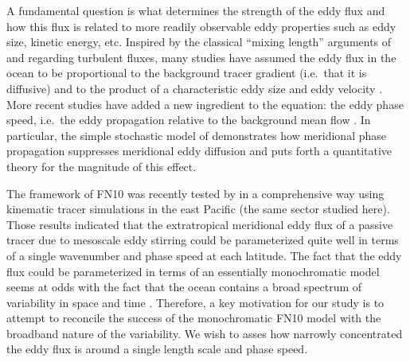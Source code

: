 \documentclass[10pt]{article}
\begin{document}
A fundamental question is what determines the strength of the eddy flux and how this flux is related to more readily observable eddy properties such as eddy size, kinetic energy, etc.
Inspired by the classical ``mixing length'' arguments of \citet{Taylor1915} and \citet{Prandtl1925} regarding turbulent fluxes, many studies have assumed the eddy flux in the ocean to be proportional to the background tracer gradient (i.e.~that it is diffusive) and to the product of a characteristic eddy size and eddy velocity \citep[e.g.][]{Holloway1986,KefferHolloway1988,VisbeckEtAl1997,Stammer1998}. More recent studies have added a new ingredient to the equation: the eddy phase speed, i.e.~the eddy propagation relative to the background mean flow \citep{MarshallEtAl2006,SmithMarshall2009,AbernatheyEtAl2010,FerrariNikurashin2010,KlockerEtAl2012a,KlockerEtAl2012b,AbernatheyMarshall2013}. In particular, the simple stochastic model of \citet[][henceforth FN10]{FerrariNikurashin2010} demonstrates how meridional phase propagation suppresses meridional eddy diffusion and puts forth a quantitative theory for the magnitude of this effect.

The framework of FN10 was recently tested by \citet[][henceforth KA14]{KlockerAbernathey2014} in a comprehensive way using kinematic tracer simulations in the east Pacific (the same sector studied here). Those results indicated that the extratropical meridional eddy flux of a passive tracer due to mesoscale eddy stirring could be parameterized quite well in terms of a single wavenumber and phase speed at each latitude. The fact that the eddy flux could be parameterized in terms of an essentially monochromatic model seems at odds with the fact that the ocean contains a broad spectrum of variability in space and time \citep{Others,WorthamWunsch2013}. Therefore, a key motivation for our study is to attempt to reconcile the success of the monochromatic FN10 model with the broadband nature of the variability. We wish to asses how narrowly concentrated the eddy flux is around a single length scale and phase speed.
\end{document}
